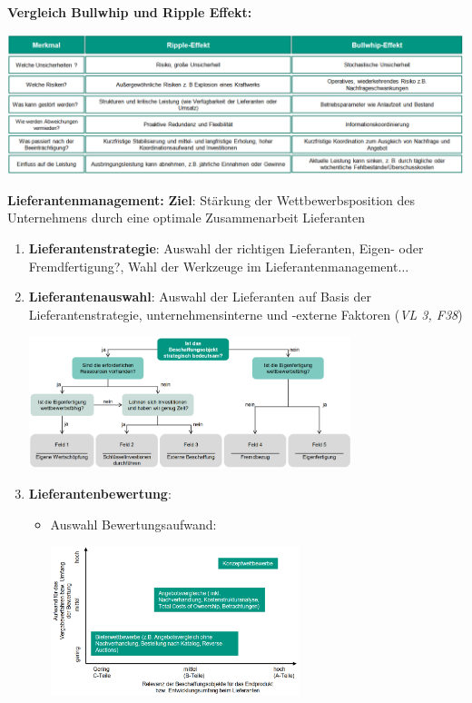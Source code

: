 \textbf{Vergleich Bullwhip und Ripple Effekt:}
\begin{center}
	\includegraphics[width=\textwidth]{images/b-r-vergleich.png}
\end{center}
\bigskip
\textbf{Lieferantenmanagement:} \textbf{Ziel}: Stärkung der Wettbewerbsposition des Unternehmens durch eine optimale Zusammenarbeit Lieferanten
\begin{enumerate}
	\item \textbf{Lieferantenstrategie}: Auswahl der richtigen Lieferanten, Eigen- oder Fremdfertigung?, Wahl der Werkzeuge im Lieferantenmanagement$\ldots$
	\item \textbf{Lieferantenauswahl}: Auswahl der Lieferanten auf Basis der Lieferantenstrategie, unternehmensinterne und -externe Faktoren (\textit{VL 3, F38})
	\begin{center}
		\includegraphics[width=0.74\textwidth]{images/lieferant.png}
	\end{center}
	\item \textbf{Lieferantenbewertung}: 
	\begin{itemize}
		\item Auswahl Bewertungsaufwand: 
		\begin{center}
			\includegraphics[width=0.6\textwidth]{images/bewertungsaufwand.png}

\end{center}
\end{itemize}
\end{enumerate}
